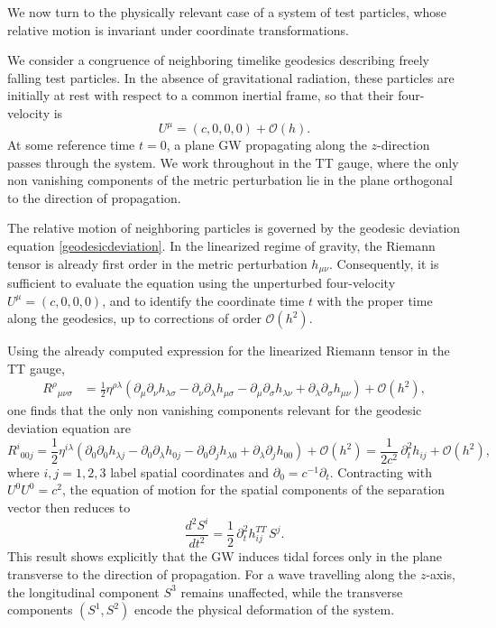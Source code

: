We now turn to the physically relevant case of a system of test particles, whose relative motion is invariant under coordinate transformations.

We consider a congruence of neighboring timelike geodesics describing freely falling test particles. In the absence of gravitational radiation, these particles are initially at rest with respect to a common inertial frame, so that their four-velocity is
\begin{equation}
U^\mu = (c,0,0,0)+ \mathcal{O}(h).
\end{equation}
At some reference time $t=0$, a plane GW propagating along the $z$-direction passes through the system. We work throughout in the TT gauge, where the only non vanishing components of the metric perturbation lie in the plane orthogonal to the direction of propagation.

The relative motion of neighboring particles is governed by the geodesic deviation equation \eqref{geodesicdeviation}. In the linearized regime of gravity, the Riemann tensor is already first order in the metric perturbation $h_{\mu\nu}$. Consequently, it is sufficient to evaluate the equation using the unperturbed four-velocity $U^\mu = (c,0,0,0)$, and to identify the coordinate time $t$ with the proper time along the geodesics, up to corrections of order $\mathcal{O}(h^2)$.

Using the already computed expression for the linearized Riemann tensor in the TT gauge, 
\begin{equation}
\begin{aligned}
R^{\rho}{}_{\mu \nu \sigma}
&= \frac{1}{2}\eta^{\rho\lambda}
\left( 
\partial_\mu \partial_\nu h_{\lambda \sigma}
- \partial_\nu \partial_\lambda h_{\mu \sigma}
- \partial_\mu \partial_\sigma h_{\lambda \nu}
+ \partial_\lambda \partial_\sigma h_{\mu \nu}
\right) + \mathcal{O}(h^2),
\end{aligned}
\end{equation}
one finds that the only non vanishing components relevant for the geodesic deviation equation are
\begin{equation}
R^i{}_{0 0 j} =\frac{1}{2}\eta^{i\lambda}
\left(
\partial_0 \partial_0 h_{\lambda j}
- \partial_0 \partial_\lambda h_{0 j}
- \partial_0 \partial_j h_{\lambda 0}
+ \partial_\lambda \partial_j h_{0 0}
\right) + \mathcal{O}(h^2)= \frac{1}{2c^2}\,\partial_t^2 h_{ij}+ \mathcal{O}(h^2),
\end{equation}
where $i,j = 1,2,3$ label spatial coordinates and $\partial_0 = c^{-1}\partial_t$. Contracting with $U^0 U^0 = c^2$, the equation of motion for the spatial components of the separation vector then reduces to
\begin{equation}
\frac{d^2 S^i}{dt^2} = \frac{1}{2}\,\partial_t^2 h^{TT}_{ij}\, S^j.
\label{eq:geodesiceq}
\end{equation}
This result shows explicitly that the GW induces tidal forces only in the plane transverse to the direction of propagation. For a wave travelling along the $z$-axis, the longitudinal component $S^3$ remains unaffected, while the transverse components $(S^1,S^2)$ encode the physical deformation of the system.


